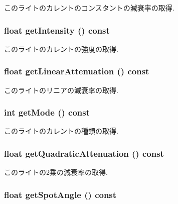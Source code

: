 このライトのカレントのコンスタントの減衰率の取得. \hypertarget{classm3g_1_1Light_ca846da41d09a6ae01d6b362c33e938d}{
\subsubsection[{getIntensity}]{\setlength{\rightskip}{0pt plus 5cm}float getIntensity () const}}
\label{classm3g_1_1Light_ca846da41d09a6ae01d6b362c33e938d}


このライトのカレントの強度の取得. \hypertarget{classm3g_1_1Light_50e949b0cc2014e576987379cac07769}{
\subsubsection[{getLinearAttenuation}]{\setlength{\rightskip}{0pt plus 5cm}float getLinearAttenuation () const}}
\label{classm3g_1_1Light_50e949b0cc2014e576987379cac07769}


このライトのリニアの減衰率の取得. \hypertarget{classm3g_1_1Light_d4ce4524e4751fe5e3cfb8c270347d54}{
\subsubsection[{getMode}]{\setlength{\rightskip}{0pt plus 5cm}int getMode () const}}
\label{classm3g_1_1Light_d4ce4524e4751fe5e3cfb8c270347d54}


このライトのカレントの種類の取得. \hypertarget{classm3g_1_1Light_9ec7130ca1977cfeb4b2cbebc31971b4}{
\subsubsection[{getQuadraticAttenuation}]{\setlength{\rightskip}{0pt plus 5cm}float getQuadraticAttenuation () const}}
\label{classm3g_1_1Light_9ec7130ca1977cfeb4b2cbebc31971b4}


このライトの2乗の減衰率の取得. \hypertarget{classm3g_1_1Light_1117f914d754fe74c090dc97bde905eb}{
\subsubsection[{getSpotAngle}]{\setlength{\rightskip}{0pt plus 5cm}float getSpotAngle () const}}
\label{classm3g_1_1Light_1117f914d754fe74c090dc97bde905eb}


